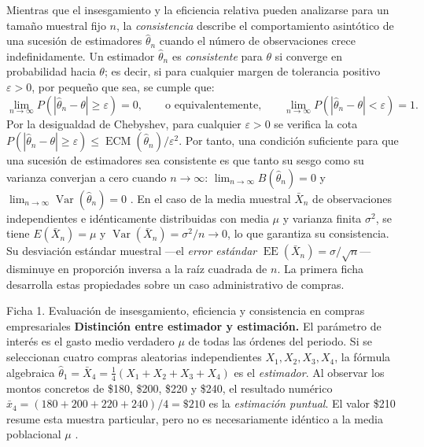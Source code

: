 {Mientras que el insesgamiento y la eficiencia relativa pueden analizarse para un tamaño muestral fijo $n$, la \textit{consistencia} describe el comportamiento asintótico de una sucesión de estimadores $\hat{\theta}_n$ cuando el número de observaciones crece indefinidamente. Un estimador $\hat{\theta}_n$ es \textit{consistente} para $\theta$ si converge en probabilidad hacia $\theta$; es decir, si para cualquier margen de tolerancia positivo $\varepsilon > 0$, por pequeño que sea, se cumple que:
\[
  \lim_{n\to\infty} P\!\left(|\hat{\theta}_n - \theta| \ge \varepsilon\right) = 0,
  \qquad\text{o equivalentemente,}\qquad
  \lim_{n\to\infty} P\!\left(|\hat{\theta}_n - \theta| < \varepsilon\right) = 1.
\]
Por la desigualdad de Chebyshev, para cualquier $\varepsilon > 0$ se verifica la cota $P(|\hat{\theta}_n - \theta| \ge \varepsilon) \le \operatorname{ECM}(\hat{\theta}_n)/\varepsilon^2$. Por tanto, una condición suficiente para que una sucesión de estimadores sea consistente es que tanto su sesgo como su varianza converjan a cero cuando $n \to \infty$: $\lim_{n\to\infty} B(\hat{\theta}_n) = 0$ y $\lim_{n\to\infty}\operatorname{Var}(\hat{\theta}_n) = 0$ \citep[sec.~9.3]{wackerly2010}. En el caso de la media muestral $\bar{X}_n$ de observaciones independientes e idénticamente distribuidas con media $\mu$ y varianza finita $\sigma^2$, se tiene $E(\bar{X}_n)=\mu$ y $\operatorname{Var}(\bar{X}_n)=\sigma^2/n \to 0$, lo que garantiza su consistencia. Su desviación estándar muestral —el \textit{error estándar} $\operatorname{EE}(\bar{X}_n) = \sigma/\sqrt{n}$— disminuye en proporción inversa a la raíz cuadrada de $n$. La primera ficha desarrolla estas propiedades sobre un caso administrativo de compras.

\begin{fichainvestigacion}{Ficha 1. Evaluación de insesgamiento, eficiencia y consistencia en compras empresariales}
\textbf{Distinción entre estimador y estimación.} El parámetro de interés es el gasto medio verdadero $\mu$ de todas las órdenes del periodo. Si se seleccionan cuatro compras aleatorias independientes $X_1, X_2, X_3, X_4$, la fórmula algebraica $\hat{\theta}_1 = \bar{X}_4 = \frac{1}{4}(X_1+X_2+X_3+X_4)$ es el \textit{estimador}. Al observar los montos concretos de \$180, \$200, \$220 y \$240, el resultado numérico $\bar{x}_4 = (180+200+220+240)/4 = \$210$ es la \textit{estimación puntual}. El valor \$210 resume esta muestra particular, pero no es necesariamente idéntico a la media poblacional $\mu$ \citep{holmesBusiness2023}.


\end{fichainvestigacion}}
